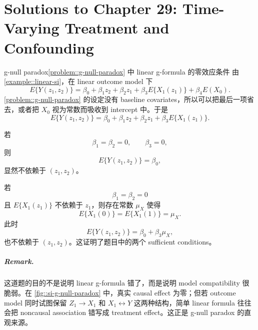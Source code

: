 \chapter{Solutions to Chapter 29: Time-Varying Treatment and Confounding}
\label{sol:chapter29}

\begin{exercisesolution}{g-null paradox}{\cref{problem::g-null-paradox} 中 linear g-formula 的零效应条件}
由 \cref{example::linear-si}，在 linear outcome model 下
\[
E\{Y(z_1,z_2)\}
=
\beta_0+\beta_1 z_2+\beta_2 z_1
+\beta_3 E\{X_1(z_1)\}+\beta_4 E(X_0).
\]
\cref{problem::g-null-paradox} 的设定没有 baseline covariates，所以可以把最后一项省去，或者把 $X_0$ 视为常数而吸收到 intercept 中。于是
\[
E\{Y(z_1,z_2)\}
=
\beta_0+\beta_1 z_2+\beta_2 z_1+\beta_3 E\{X_1(z_1)\}.
\]

若
\[
\beta_1=\beta_2=0,\qquad \beta_3=0,
\]
则
\[
E\{Y(z_1,z_2)\}=\beta_0,
\]
显然不依赖于 $(z_1,z_2)$。

若
\[
\beta_1=\beta_2=0
\]
且 $E\{X_1(z_1)\}$ 不依赖于 $z_1$，则存在常数 $\mu_X$ 使得
\[
E\{X_1(0)\}=E\{X_1(1)\}=\mu_X.
\]
此时
\[
E\{Y(z_1,z_2)\}=\beta_0+\beta_3\mu_X,
\]
也不依赖于 $(z_1,z_2)$。这证明了题目中的两个 sufficient conditions。

\paragraph{Remark.}
这道题的目的不是说明 linear g-formula 错了，而是说明 model compatibility 很脆弱。在 \cref{fig::si-g-null-paradox} 中，真实 causal effect 为零；但若 outcome model 同时试图保留 $Z_1\rightarrow X_1$ 和 $X_1\leftrightarrow Y$ 这两种结构，简单 linear formula 往往会把 noncausal association 错写成 treatment effect。这正是 g-null paradox 的直观来源。
\end{exercisesolution}

